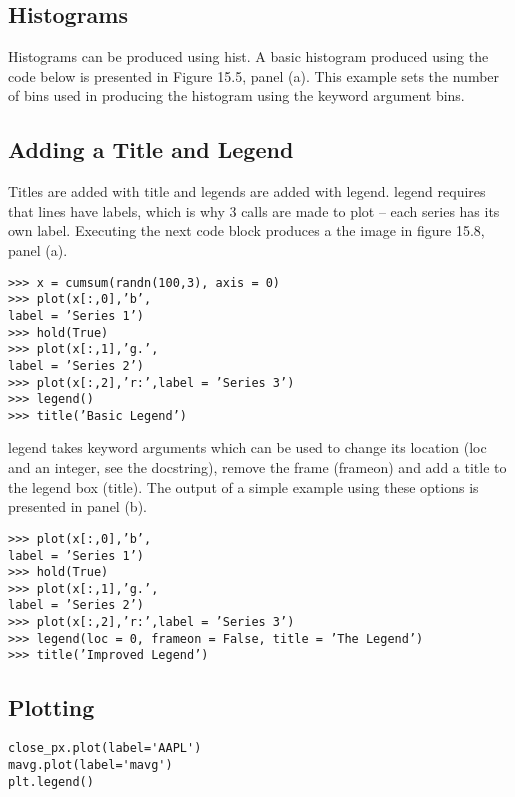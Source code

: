 \documentclass[KSmain.tex]{subfiles}
\begin{document}
\subsection{Histograms}

Histograms can be produced using hist. A basic histogram produced using the code below is presented
in Figure 15.5, panel (a). This example sets the number of bins used in producing the histogram using the
keyword argument bins.

\subsection{Adding a Title and Legend}
Titles are added with title and legends are added with legend. legend requires that lines have labels,
which is why 3 calls are made to plot – each series has its own label. Executing the next code block produces
a the image in figure 15.8, panel (a).

\begin{framed}
\begin{verbatim}
>>> x = cumsum(randn(100,3), axis = 0)
>>> plot(x[:,0],’b’,
label = ’Series 1’)
>>> hold(True)
>>> plot(x[:,1],’g.’,
label = ’Series 2’)
>>> plot(x[:,2],’r:’,label = ’Series 3’)
>>> legend()
>>> title(’Basic Legend’)
\end{verbatim}
\end{framed}


legend takes keyword arguments which can be used to change its location (loc and an integer, see the
docstring), remove the frame (frameon) and add a title to the legend box (title). The output of a simple
example using these options is presented in panel (b).



\begin{framed}
\begin{verbatim}
>>> plot(x[:,0],’b’,
label = ’Series 1’)
>>> hold(True)
>>> plot(x[:,1],’g.’,
label = ’Series 2’)
>>> plot(x[:,2],’r:’,label = ’Series 3’)
>>> legend(loc = 0, frameon = False, title = ’The Legend’)
>>> title(’Improved Legend’)
\end{verbatim}
\end{framed}

\newpage
\subsection{Plotting}

\begin{framed}
\begin{verbatim}
close_px.plot(label='AAPL')
mavg.plot(label='mavg')
plt.legend()

\end{verbatim}
\end{framed}
\end{document}

